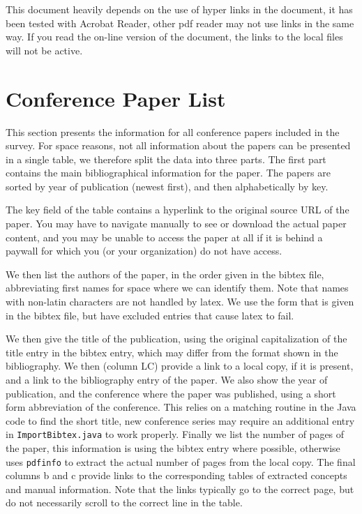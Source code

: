 \documentclass[a4paper]{article}
\begin{document}
This document heavily depends on the use of hyper links in the document, it has been tested with Acrobat Reader, other pdf reader may not use links in the same way. If you read the on-line version of the document, the links to the local files will not be active.

\clearpage


\section{Conference Paper List}

This section presents the information for all conference papers included in the survey. For space reasons, not all information about the papers can be presented in a single table, we therefore split the data into three parts. The first part contains the main bibliographical information for the paper. The papers are sorted by year of publication (newest first), and then alphabetically by key. 

The key field of the table contains a hyperlink to the original source URL of the paper. You may have to navigate manually to see or download the actual paper content, and you may be unable to access the paper at all if it is behind a paywall for which you (or your organization) do not have access.

We then list the authors of the paper, in the order given in the bibtex file, abbreviating first names for space where we can identify them. Note that names with non-latin characters are not handled by latex. We use the form that is given in the bibtex file, but have excluded entries that cause latex to fail.  

We then give the title of the publication, using the original capitalization of the title entry in the bibtex entry, which may differ from the format shown in the bibliography. We then (column LC) provide a link to a local copy, if it is present, and a link to the bibliography entry of the paper.  We also show the year of publication, and the conference where the paper was published, using a short form abbreviation of the conference. This relies on a matching routine in the Java code to find the short title, new conference series may require an additional entry in \texttt{ImportBibtex.java} to work properly. Finally we list the number of pages of the paper, this information is using the bibtex entry where possible, otherwise uses \texttt{pdfinfo} to extract the actual number of pages from the local copy. The final columns b and c provide links to the corresponding tables of extracted concepts and manual information. Note that the links typically go to the correct page, but do not necessarily scroll to the correct line in the table.
\end{document}

